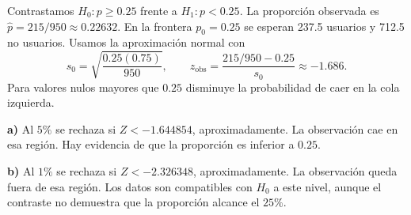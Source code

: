 Contrastamos $H_0:p\ge0.25$ frente a $H_1:p<0.25$.
La proporción observada es $\hat p=215/950\approx0.22632$.
En la frontera $p_0=0.25$ se esperan 237.5 usuarios y
712.5 no usuarios. Usamos la aproximación normal con
\[
s_0=\sqrt{\frac{0.25(0.75)}{950}},\qquad
z_{\mathrm{obs}}=\frac{215/950-0.25}{s_0}\approx-1.686.
\]
Para valores nulos mayores que $0.25$ disminuye la
probabilidad de caer en la cola izquierda.

\textbf{a)} Al $5\%$ se rechaza si $Z<-1.644854$,
aproximadamente. La observación cae en esa región.
Hay evidencia de que la proporción es inferior a $0.25$.

\textbf{b)} Al $1\%$ se rechaza si $Z<-2.326348$,
aproximadamente. La observación queda fuera de esa región.
Los datos son compatibles con $H_0$ a este nivel, aunque
el contraste no demuestra que la proporción alcance el $25\%$.

